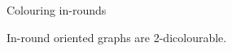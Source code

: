 \documentclass{beamer}
\begin{document}
\begin{frame}{Colouring in-rounds}

\begin{theorem}
In-round oriented graphs are 2-dicolourable.
\end{theorem}



\end{frame}
\end{document}
